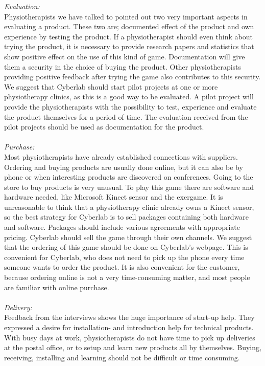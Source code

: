 \emph{Evaluation:}\\
Physiotherapists we have talked to pointed out two very important aspects in evaluating a product. These two are; documented effect of the product and own experience by testing the product. If a physiotherapist should even think about trying the product, it is necessary to provide research papers and statistics that show positive effect on the use of this kind of game. Documentation will give them a security in the choice of buying the product. Other physiotherapists providing positive feedback after trying the game also contributes to this security. We suggest that Cyberlab should start pilot projects at one or more physiotherapy clinics, as this is a good way to be evaluated. A pilot project will provide the physiotherapists with the possibility to test, experience and evaluate the product themselves for a period of time. The evaluation received from the pilot projects should be used as documentation for the product.\\ \\
\emph{Purchase:} \\
Most physiotherapists have already established connections with suppliers. Ordering and buying products are usually done online, but it can also be by phone or when interesting products are discovered on conferences. Going to the store to buy products is very unusual. To play this game there are software and hardware needed, like Microsoft Kinect sensor and the exergame. It is unreasonable to think that a physiotherapy clinic already owns a Kinect sensor, so the best strategy for Cyberlab is to sell packages containing both hardware and software. Packages should include various agreements with appropriate pricing. Cyberlab should sell the game through their own channels. We suggest that the ordering of this game should be done on Cyberlab's webpage. This is convenient for Cyberlab, who does not need to pick up the phone every time someone wants to order the product. It is also convenient for the customer, because ordering online is not a very time-consuming matter, and most people are familiar with online purchase. \\ \\
\emph{Delivery:}\\
Feedback from the interviews shows the huge importance of start-up help. They expressed a desire for installation- and introduction help for technical products. With busy days at work, physiotherapists do not have time to pick up deliveries at the postal office, or to setup and learn new products all by themselves. Buying, receiving, installing and learning should not be difficult or time consuming. \\ \\
